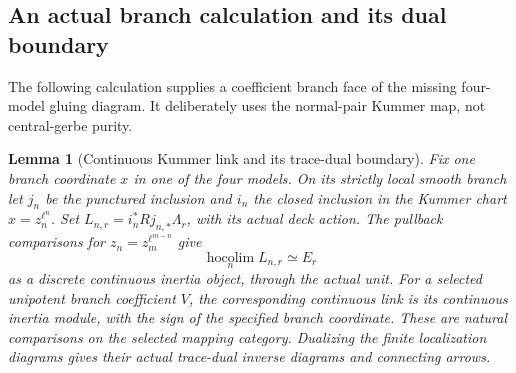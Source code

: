 \documentclass[11pt]{article}
\newtheorem{lemma}[proposition]{Lemma}
\theoremstyle{definition}
\theoremstyle{remark}
\begin{document}
\subsection{An actual branch calculation and its dual boundary}
\label{sec:root-branch-calculation}
The following calculation supplies a coefficient branch face of
the missing four-model gluing diagram.  It deliberately uses the
normal-pair Kummer map, not central-gerbe purity.

\begin{lemma}[Continuous Kummer link and its trace-dual boundary]
\label{lem:root-branch-link}
Fix one branch coordinate $x$ in one of the four models.  On its
strictly local smooth branch let $j_n$ be the punctured inclusion
and $i_n$ the closed inclusion in the Kummer chart
$x=z_n^{\ell^n}$.  Set
$L_{n,r}=i_n^*Rj_{n,*}\Lambda_r$, with its actual deck action.
The pullback comparisons for $z_n=z_m^{\ell^{m-n}}$ give
\[
 \operatorname*{hocolim}_n L_{n,r}\simeq E_r
\]
as a discrete continuous inertia object, through the actual unit.
For a selected unipotent branch coefficient $V$, the corresponding
continuous link is its continuous inertia module, with the sign
of the specified branch coordinate.  These are natural comparisons
on the selected mapping category.  Dualizing the finite localization
diagrams gives their actual trace-dual inverse diagrams and
connecting arrows.
\end{lemma}
\end{document}
